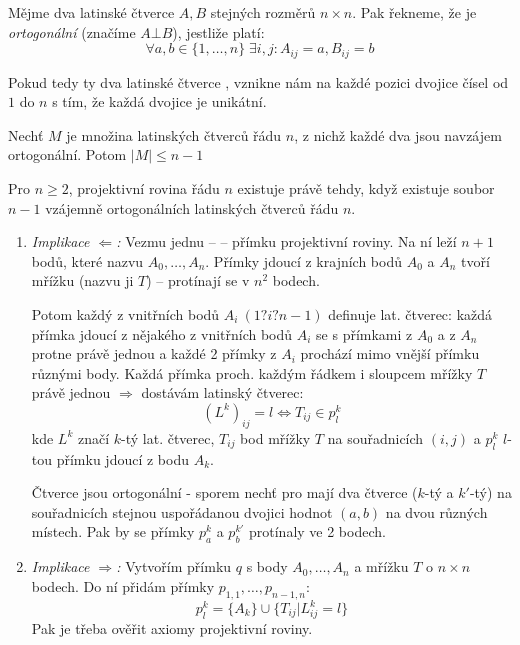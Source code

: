 \begin{definice}
Mějme dva latinské čtverce $A, B$ stejných rozměrů $n \times n$. Pak řekneme, že je \emph{ortogonální} (značíme $A \bot B$), jestliže platí:
$$\forall a,b \in \{1,\dots,n\} \;\exists i,j: A_{ij}=a, B_{ij}=b$$

Pokud tedy ty dva latinské čtverce , vznikne nám na každé pozici dvojice čísel od $1$ do $n$ s tím, že každá dvojice je unikátní.
\end{definice}

\begin{veta}
Nechť $M$ je množina latinských čtverců řádu $n$, z nichž každé dva jsou navzájem ortogonální. Potom $|M| \le n-1$
\end{veta}

\begin{veta}
Pro $n \ge 2$, projektivní rovina řádu $n$ existuje právě tehdy, když existuje soubor $n-1$ vzájemně ortogonálních latinských čtverců řádu $n$.
\par\medskip
\begin{dukaz}
\begin{enumerate}
    \item \emph{Implikace $\Leftarrow$:} Vezmu jednu --  -- přímku projektivní roviny. Na ní leží $n+1$ bodů, které nazvu $A_0,\dots,A_n$. Přímky jdoucí z krajních bodů $A_0$ a $A_n$ tvoří mřížku (nazvu ji $T$) -- protínají se v $n^2$ bodech. 

Potom každý z vnitřních bodů $A_i\ (1 ? i ? n-1)$ definuje lat. čtverec: každá přímka jdoucí z nějakého z vnitřních bodů $A_i$ se s přímkami z $A_0$ a z $A_n$ protne právě jednou a každé 2 přímky z $A_i$ prochází mimo vnější přímku různými body. Každá přímka proch. každým řádkem i sloupcem mřížky $T$ právě jednou $\Rightarrow$ dostávám latinský čtverec: 
$$(L^k)_{ij} = l \Leftrightarrow T_{ij} \in p^k_l$$
kde $L^k$ značí $k$-tý lat. čtverec, $T_{ij}$ bod mřížky $T$ na souřadnicích $(i,j)$ a $p^k_l$ $l$-tou přímku jdoucí z bodu $A_k$. 

Čtverce jsou ortogonální - sporem nechť pro mají dva čtverce ($k$-tý a $k'$-tý) na souřadnicích stejnou uspořádanou dvojici hodnot $(a,b)$ na dvou různých místech. Pak by se přímky $p^k_a$ a $p^{k'}_b$ protínaly ve 2 bodech.

    \item \emph{Implikace $\Rightarrow$:} Vytvořím přímku $q$ s body $A_0,\dots,A_n$ a mřížku $T$ o $n\times n$ bodech. Do ní přidám přímky $p_{1,1},\dots,p_{n-1,n}$: 
$$p_l^k = \{A_k\} \cup \{T_{ij} | L^k_{ij} = l \}$$ 
Pak je třeba ověřit axiomy projektivní roviny. 
\end{enumerate}
\end{dukaz}
\end{veta}
